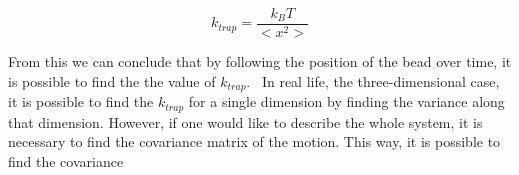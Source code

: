 \begin{equation}
	\label{eq_k_trap}
	k_{trap} = \frac{k_B T}{<x^2>}
\end{equation}

From this we can conclude that by following the position of the bead over time, it is possible to find the the value of $k_{trap}$. \
In real life, the three-dimensional case, it is possible to find the $k_{trap}$ for a single dimension by finding the variance along that dimension. However, if one would like to describe the whole system, it is necessary to find the covariance matrix of the motion. This way, it is possible to find the covariance 


